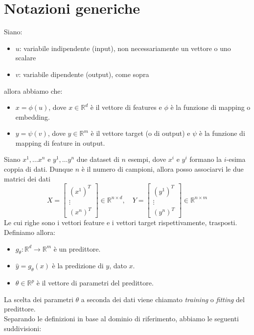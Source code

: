 \documentclass{../main.tex}[subfiles]
\begin{document}
\section{Notazioni generiche}
Siano:
\begin{itemize}
	\item $u$: variabile indipendente (input), non necessariamente un vettore o uno scalare
	\item $v$: variabile dipendente (output), come sopra 
\end{itemize}
allora abbiamo che:
\begin{itemize}
	\item $x=\phi(u)$, dove $x\in \mathbb{R}^d$ è il vettore di features e $\phi$ è la funzione di mapping o embedding.
	\item $y=\psi(v)$, dove $y\in \mathbb{R}^m$ è il vettore target (o di output) e $\psi$ è la funzione di mapping di feature in output.
\end{itemize}
Siano $x^1,\dots x^n$ e $y^1,\dots y^n$ due dataset di $n$ esempi, dove $x^i$ e $y^i$ formano la $i$-esima coppia di dati. Dunque $n$ è il numero di campioni, allora posso associarvi le due matrici dei dati
$$X=\begin{bmatrix}
	(x^1)^T\\ \vdots \\ (x^n)^T
\end{bmatrix}\in \mathbb{R}^{n \times d}, \quad Y=\begin{bmatrix}
	(y^1)^T\\ \vdots \\ (y^n)^T
\end{bmatrix}\in \mathbb{R}^{n \times m}$$
Le cui righe sono i vettori feature e i vettori target rispettivamente, trasposti.\\
Definiamo allora:
\begin{itemize}
	\item $g_\theta: \mathbb{R}^d \to \mathbb{R}^m$ è un predittore. 
	\item $\hat{y}=g_\theta(x)$ è la predizione di $y$, dato $x$.
	\item $\theta\in\mathbb{R}^p$ è il vettore di parametri del predittore.
\end{itemize}
La scelta dei parametri $\theta$ a seconda dei dati viene chiamato \textit{training} o \textit{fitting} del predittore. 
\\
Separando le definizioni in base al dominio di riferimento, abbiamo le seguenti suddivisioni:
\end{document}
